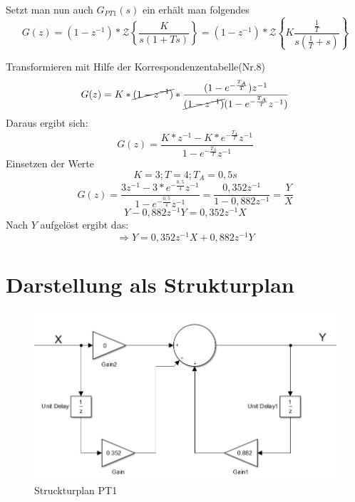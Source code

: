 \documentclass[12pt,a4paper]{report}
\begin{document}
Setzt man nun auch $G_{PT1}(s)$ ein erhält man folgendes
\begin{equation}
G(z) = (1-z^{-1})*\mathcal{Z}\left\{\frac{K}{s(1+Ts)}\right\} =  (1-z^{-1})*\mathcal{Z}\left\{K\frac{\frac{1}{T}}{s(\frac{1}{T}+s)}\right\}
\end{equation}

Transformieren mit Hilfe der Korrespondenzentabelle(Nr.8)
\begin{equation}
G(z) = K*\cancel{(1-z^{-1})}*
\frac{(1-e^{-\frac{T_A}{T}})z^{-1}}
{\cancel{(1-z^{-1})}(1-e^{-\frac{T_A}{T}}z^{-1})}
\end{equation}
Daraus ergibt sich: 
\begin{equation}
G(z) = \frac{K*z^{-1}-K*e^{-\frac{T_A}{T}}z^{-1}}
{1-e^{-\frac{T_A}{T}}z^{-1}} 
\end{equation}
Einsetzen der Werte
\begin{equation}
K = 3; T = 4; T_A = 0,5s
\end{equation}
\begin{equation}
G(z) = \frac{3z^{-1}-3*e^{-\frac{0,5}{4}}z^{-1}}
{1-e^{-\frac{0,5}{4}}z^{-1}} = \frac{0,352z^{-1}}{1-0,882z^{-1}} = \frac{Y}{X}
\end{equation}
\begin{equation}
Y- 0,882z^{-1}Y = 0,352z^{-1}X
\end{equation}
Nach $ Y $ aufgelöst ergibt das:
\begin{equation}
\Rightarrow Y = 0,352z^{-1}X + 0,882z^{-1}Y
\end{equation}
\section{Darstellung als Strukturplan}
\begin{figure}[ht]
	\centering
	\includegraphics[width=0.8\linewidth]{marius/PT1}
	\caption{Struckturplan PT1}
	\label{fig:PT1}
\end{figure}
\end{document}
